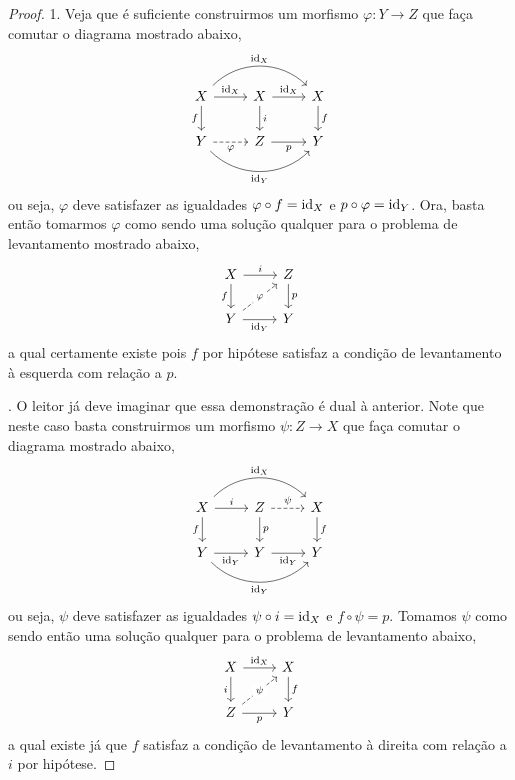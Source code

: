\begin{proof}
  1. Veja que é suficiente construirmos um morfismo $\varphi: Y \to Z$ que faça comutar o diagrama mostrado abaixo,
  \begin{displaymath}
    \begin{tikzcd}
      X
      \arrow[r, "\id_X"]
      \arrow[rr, bend left=45, "\id_X"]
      \arrow[d, "f" swap]
      & X
      \arrow[r, "\id_X"]
      \arrow[d, "i"]
      & X
      \arrow[d, "f"]
      \\ Y
      \arrow[r, dashed, "\varphi" swap]
      \arrow[rr, bend right=45, "\id_Y" swap]
      & Z
      \arrow[r, "p" swap]
      & Y
    \end{tikzcd}
  \end{displaymath}
  ou seja, $\varphi$ deve satisfazer as igualdades $\varphi \circ f = \mathrm{id}_X$ e $p \circ \varphi = \mathrm{id}_Y$.
  Ora, basta então tomarmos $\varphi$ como sendo uma solução qualquer para o problema de levantamento mostrado abaixo,
  \begin{displaymath}
    \begin{tikzcd}
      X
      \arrow[r, "i"]
      \arrow[d, "f" swap]
      & Z
      \arrow[d, "p"]
      \\ Y
      \arrow[r, "\id_Y" swap]
      \arrow[ru, dashed, "\varphi" description]
      & Y
    \end{tikzcd}
  \end{displaymath}
  a qual certamente existe pois $f$ por hipótese satisfaz a condição de levantamento à esquerda com relação a $p$.

  . O leitor já deve imaginar que essa demonstração é dual à anterior.
  Note que neste caso basta construirmos um morfismo $\psi: Z \to X$ que faça comutar o diagrama mostrado abaixo,
  \begin{displaymath}
    \begin{tikzcd}
      X
      \arrow[r, "i"]
      \arrow[rr, bend left=45, "\id_X"]
      \arrow[d, "f" swap]
      & Z
      \arrow[r, dashed, "\psi"]
      \arrow[d, "p"]
      & X
      \arrow[d, "f"]
      \\ Y
      \arrow[r, "\id_Y" swap]
      \arrow[rr, bend right=45, "\id_Y" swap]
      & Y
      \arrow[r, "\id_Y" swap]
      & Y
    \end{tikzcd}
  \end{displaymath}
  ou seja, $\psi$ deve satisfazer as igualdades $\psi \circ i = \mathrm{id}_X$ e $f \circ \psi = p$.
  Tomamos $\psi$ como sendo então uma solução qualquer para o problema de levantamento abaixo,
  \begin{displaymath}
    \begin{tikzcd}
      X
      \arrow[r, "\id_X"]
      \arrow[d, "i" swap]
      & X
      \arrow[d, "f"]
      \\ Z
      \arrow[r, "p" swap]
      \arrow[ru, dashed, "\psi" description]
      & Y
    \end{tikzcd}
  \end{displaymath}
  a qual existe já que $f$ satisfaz a condição de levantamento à direita com relação a $i$ por hipótese.
\end{proof}

